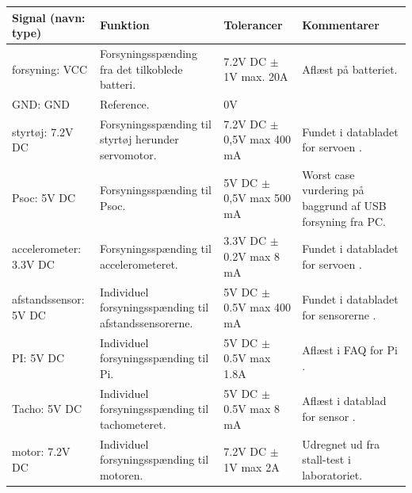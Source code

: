 \begin{table}[h]
	\centering
	\begin{tabularx}{\textwidth}{|l|Z|Z|Z|} \hline
	\textbf{Signal (navn: type)} & \textbf{Funktion} & \textbf{Tolerancer} & \textbf{Kommentarer} \\ \hline
forsyning: VCC
	& Forsyningsspænding fra det tilkoblede batteri. 
	& 7.2V DC $\pm$ 1V max. 20A
 	& Aflæst på batteriet.
	\\ \hline
	
GND: GND
	& Reference. 
	& 0V
 	& ~
	\\ \hline
	
styrtøj: 7.2V DC
	& Forsyningsspænding til styrtøj herunder servomotor. 
	& 7.2V DC $\pm$ 0,5V max 400 mA
 	& Fundet i databladet for servoen \cite{lib:servo}.
	\\ \hline
	
Psoc: 5V DC
	& Forsyningsspænding til Psoc. 
	& 5V DC $\pm$ 0,5V max 500 mA
 	& Worst case vurdering på baggrund af USB forsyning fra PC.
	\\ \hline
	
	
accelerometer: 3.3V DC
	& Forsyningsspænding til accelerometeret.
	& 3.3V DC $\pm$ 0.2V max 8 mA
 	& Fundet i databladet for servoen \cite{lib:accel}.
	\\ \hline
	
afstandssensor: 5V DC
	& Individuel forsyningsspænding til afstandssensorerne.
	& 5V DC $\pm$ 0.5V max 400 mA
 	& Fundet i databladet for sensorerne \cite{lib:maxsonar}.
	\\ \hline
	
PI: 5V DC
	& Individuel forsyningsspænding til Pi.
	& 5V DC $\pm$ 0.5V max 1.8A
 	& Aflæst i FAQ for Pi \cite{lib:PI2PSU}.
	\\ \hline
	
Tacho: 5V DC
	& Individuel forsyningsspænding til tachometeret.
	& 5V DC $\pm$ 0.5V max 8 mA
 	& Aflæst i datablad for sensor \cite{lib:tacho}.
	\\ \hline
	
motor: 7.2V DC
	& Individuel forsyningsspænding til motoren.
	& 7.2V DC $\pm$ 1V max 2A

 	& Udregnet ud fra stall-test i laboratoriet.
	\\ \hline
	\end{tabularx}
	\label{tbl:bil_forsyninger}
\end{table}
\clearpage

\clearpage

\clearpage

\clearpage

\clearpage

